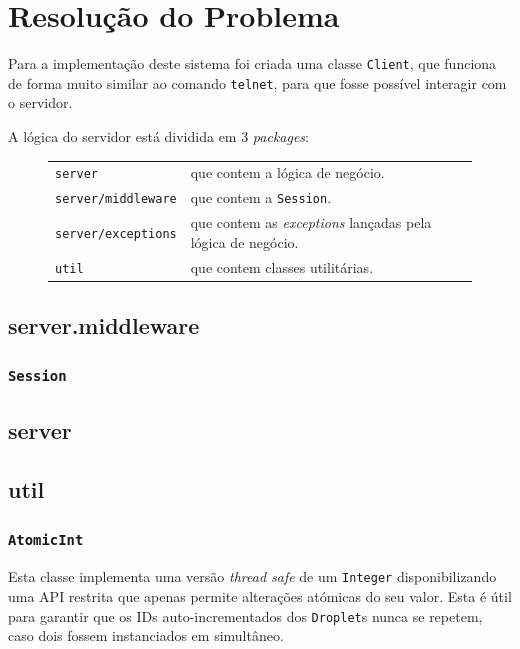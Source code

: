 \documentclass[a4paper]{article}
\begin{document}
\pagebreak
\section{Resolução do Problema}

Para a implementação deste sistema foi criada uma classe \texttt{Client}, que funciona de forma muito similar ao comando \texttt{telnet}, para que fosse possível interagir com o servidor.

A lógica do servidor está dividida em 3 \textit{packages}:

\begin{figure}[H]
    \begin{tabular}{ll}
        \texttt{server}            & que contem a lógica de negócio.\\
        \texttt{server/middleware} & que contem a \texttt{Session}.\\
        \texttt{server/exceptions} & que contem as \textit{exceptions} lançadas pela lógica de negócio.\\
        \texttt{util}              & que contem classes utilitárias.
    \end{tabular}
\end{figure}

\subsection{server.middleware}
\subsubsection{\texttt{Session}}


\subsection{server}


\subsection{util}
\subsubsection{\texttt{AtomicInt}}

Esta classe implementa uma versão \textit{thread safe} de um \texttt{Integer} disponibilizando uma API restrita que apenas permite alterações atómicas do seu valor. Esta é útil para garantir que os IDs auto-incrementados dos \texttt{Droplet}s nunca se repetem, caso dois fossem instanciados em simultâneo.
\end{document}
